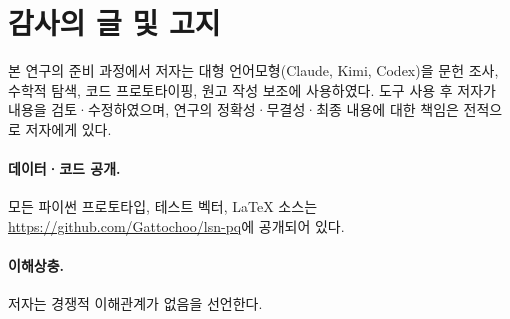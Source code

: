 \documentclass[11pt,a4paper]{article}
\theoremstyle{plain}
\theoremstyle{definition}
\begin{document}
\section*{감사의 글 및 고지}
본 연구의 준비 과정에서 저자는 대형 언어모형(Claude, Kimi, Codex)을 문헌 조사, 수학적 탐색, 코드 프로토타이핑, 원고 작성 보조에 사용하였다. 도구 사용 후 저자가 내용을 검토·수정하였으며, 연구의 정확성·무결성·최종 내용에 대한 책임은 전적으로 저자에게 있다.

\paragraph{\textbf{데이터·코드 공개.}} 모든 파이썬 프로토타입, 테스트 벡터, \LaTeX{} 소스는 \url{https://github.com/Gattochoo/lsn-pq}에 공개되어 있다.

\paragraph{\textbf{이해상충.}} 저자는 경쟁적 이해관계가 없음을 선언한다.
\end{document}
